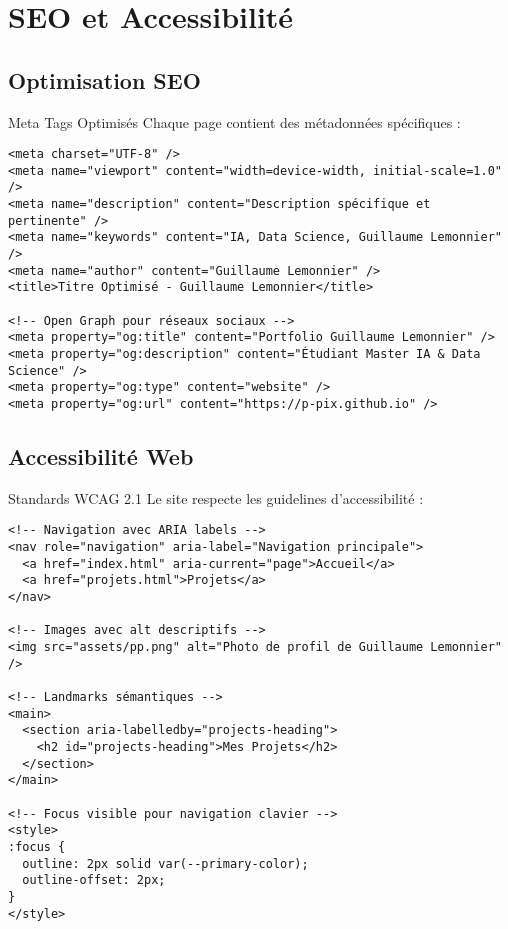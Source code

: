 \documentclass[12pt,a4paper]{article}
\begin{document}
\section{SEO et Accessibilité}

\subsection{Optimisation SEO}

\begin{bluebox}{Meta Tags Optimisés}
Chaque page contient des métadonnées spécifiques :
\end{bluebox}

\begin{lstlisting}[style=htmlstyle, caption=Meta tags SEO]
<meta charset="UTF-8" />
<meta name="viewport" content="width=device-width, initial-scale=1.0" />
<meta name="description" content="Description spécifique et pertinente" />
<meta name="keywords" content="IA, Data Science, Guillaume Lemonnier" />
<meta name="author" content="Guillaume Lemonnier" />
<title>Titre Optimisé - Guillaume Lemonnier</title>

<!-- Open Graph pour réseaux sociaux -->
<meta property="og:title" content="Portfolio Guillaume Lemonnier" />
<meta property="og:description" content="Étudiant Master IA & Data Science" />
<meta property="og:type" content="website" />
<meta property="og:url" content="https://p-pix.github.io" />
\end{lstlisting}

\subsection{Accessibilité Web}

\begin{yellowbox}{Standards WCAG 2.1}
Le site respecte les guidelines d'accessibilité :
\end{yellowbox}

\begin{lstlisting}[style=htmlstyle, caption=Éléments d'accessibilité]
<!-- Navigation avec ARIA labels -->
<nav role="navigation" aria-label="Navigation principale">
  <a href="index.html" aria-current="page">Accueil</a>
  <a href="projets.html">Projets</a>
</nav>

<!-- Images avec alt descriptifs -->
<img src="assets/pp.png" alt="Photo de profil de Guillaume Lemonnier" />

<!-- Landmarks sémantiques -->
<main>
  <section aria-labelledby="projects-heading">
    <h2 id="projects-heading">Mes Projets</h2>
  </section>
</main>

<!-- Focus visible pour navigation clavier -->
<style>
:focus {
  outline: 2px solid var(--primary-color);
  outline-offset: 2px;
}
</style>
\end{lstlisting}
\end{document}

